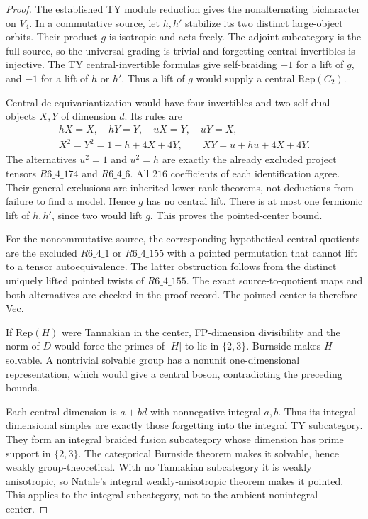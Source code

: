 \begin{proof}
The established TY module reduction gives the nonalternating bicharacter
on $V_4$. In a commutative source, let $h,h'$ stabilize its two distinct
large-object orbits. Their product $g$ is isotropic and acts freely.
The adjoint subcategory is the full source, so the universal grading
is trivial and forgetting central invertibles is injective.
The TY central-invertible formulas give self-braiding $+1$ for a lift
of $g$, and $-1$ for a lift of $h$ or $h'$. Thus a lift of $g$ would
supply a central Rep$(C_2)$.

Central de-equivariantization would have four invertibles and two
self-dual objects $X,Y$ of dimension $d$. Its rules are
\begin{gather*}
 hX=X,\quad hY=Y,\quad uX=Y,\quad uY=X,\\
 X^2=Y^2=1+h+4X+4Y,\qquad XY=u+hu+4X+4Y.
\end{gather*}
The alternatives $u^2=1$ and $u^2=h$ are exactly the already excluded
project tensors $R6\_4\_174$ and $R6\_4\_6$. All $216$ coefficients
of each identification agree. Their general exclusions are inherited
lower-rank theorems, not deductions from failure to find a model.
Hence $g$ has no central lift. There is at most one fermionic lift of
$h,h'$, since two would lift $g$. This proves the pointed-center bound.

For the noncommutative source, the corresponding hypothetical central
quotients are the excluded $R6\_4\_1$ or $R6\_4\_155$ with a pointed
permutation that cannot lift to a tensor autoequivalence. The latter
obstruction follows from the distinct uniquely lifted pointed twists
of $R6\_4\_155$. The exact source-to-quotient maps and both alternatives
are checked in the proof record. The pointed center is therefore Vec.

If Rep$(H)$ were Tannakian in the center, FP-dimension divisibility
and the norm of $D$ would force the primes of $|H|$ to lie in $\{2,3\}$.
Burnside makes $H$ solvable. A nontrivial solvable group has a nonunit
one-dimensional representation, which would give a central boson,
contradicting the preceding bounds.

Each central dimension is $a+bd$ with nonnegative integral $a,b$.
Thus its integral-dimensional simples are exactly those forgetting into
the integral TY subcategory. They form an integral braided fusion
subcategory whose dimension has prime support in $\{2,3\}$. The
categorical Burnside theorem makes it solvable, hence weakly
group-theoretical. With no Tannakian subcategory it is weakly
anisotropic, so Natale's integral weakly-anisotropic theorem makes it
pointed. This applies to the integral subcategory, not to the ambient
nonintegral center.
\end{proof}

